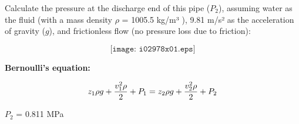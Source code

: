 

Calculate the pressure at the discharge end of this pipe ($P_2$), assuming water as the fluid (with a mass density $\rho$ = 1005.5 kg/m³ ),  9.81 m/s² as the acceleration of gravity ($g$), and frictionless flow (no pressure loss due to friction):

$$\texttt{[image: i02978x01.eps]}$$


\vskip 10pt

\noindent
{\bf Bernoulli's equation:}

$$z_1 \rho g + {v_1^2 \rho \over 2} + P_1 = z_2 \rho g + {v_2^2 \rho \over 2} + P_2$$







$P_2$ = 0.811 MPa











